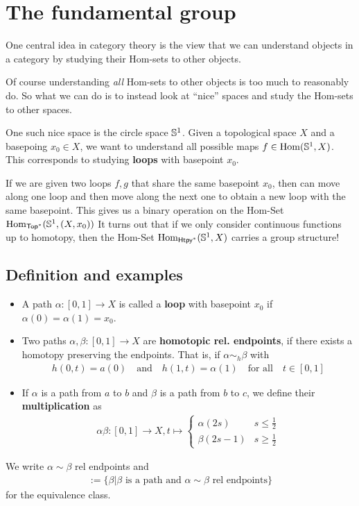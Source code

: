 \section{The fundamental group}
One central idea in category theory is the view that we can understand objects in a category by studying their Hom-sets to other objects.

Of course understanding \emph{all} Hom-sets to other objects is too much to reasonably do.
So what we can do is to instead look at ``nice'' spaces and study the Hom-sets to other spaces.

One such nice space is the circle space $\mathbb{S}^{1}$.
Given a topological space $X$ and a basepoing $x_0 \in X$, we want to understand all possible maps $f \in \operatorname{Hom}(\mathbb{S}^{1},X)$.
This corresponds to studying \textbf{loops} with basepoint $x_0$.

If we are given two loops $f,g$ that share the same basepoint $x_0$, then can move along one loop and then move along the next one to obtain a new loop with the same basepoint.
This gives us a binary operation on the Hom-Set $\operatorname{Hom}_{\text{\sffamily Top}^{\ast}}(\mathbb{S}^{1},(X,x_0))$
It turns out that if we only consider continuous functions up to homotopy, then the Hom-Set $\operatorname{Hom}_{\text{\sffamily Htpy}^{\ast}}(\mathbb{S}^{1},X)$ carries a group structure!


\subsection{Definition and examples}


\begin{dfn}[]
\begin{itemize}
  \item A path $\alpha: [0,1] \to  X$ is called a \textbf{loop} with basepoint $x_0$ if $\alpha(0) = \alpha(1) = x_0$.
  \item Two paths $\alpha,\beta: [0,1] \to  X$ are \textbf{homotopic rel. endpoints}, if there exists a homotopy preserving the endpoints. That is, if $\alpha\sim_h \beta$ with
    \begin{align*}
      h(0,t) = a(0) \quad \text{and} \quad h(1,t) = \alpha(1) \quad \text{for all} \quad t \in [0,1]
    \end{align*}
  \item If $\alpha$ is a path from $a$ to $b$ and $\beta$ is a path from $b$ to $c$, we define their \textbf{multiplication} as
    \begin{align*}
      \alpha \beta : [0,1] \to  X, t \mapsto  \left\{\begin{array}{ll}
          \alpha(2s) & s \leq \tfrac{1}{2}\\
          \beta(2s - 1) & s \geq \tfrac{1}{2}
      \end{array} \right.
    \end{align*}
\end{itemize} 
We write $\alpha \sim \beta$ rel endpoints and
\begin{align*}
  [\alpha] := \{\beta | \beta\text{ is a path and } \alpha \sim \beta \text{ rel endpoints}\}
\end{align*}
for the equivalence class.
\end{dfn}


